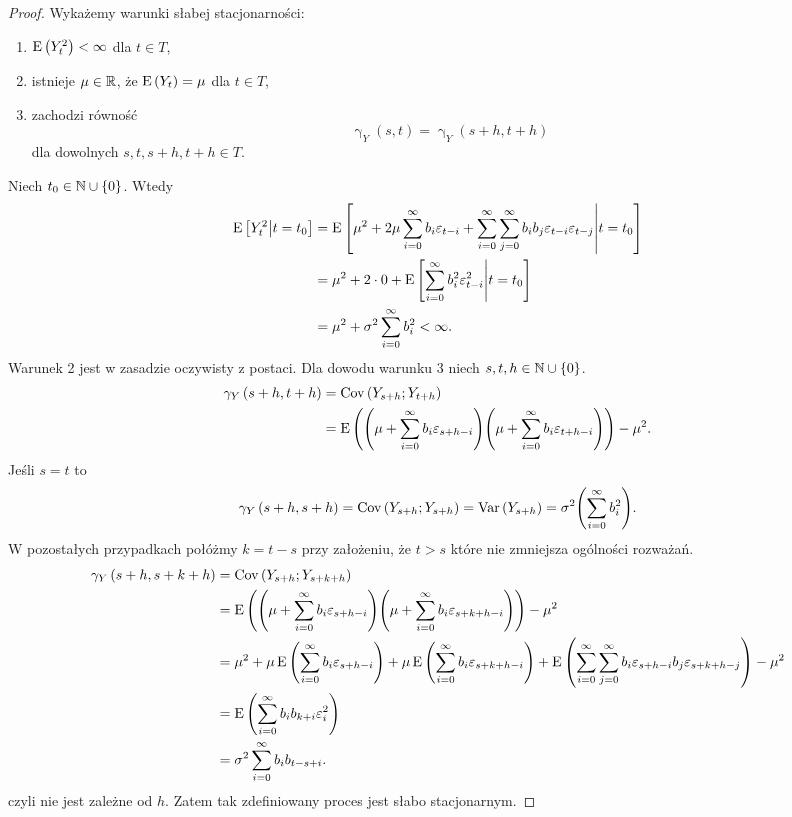 \documentclass[10pt,a4paper]{book}
\newcommand{\tsAutoCovariance}[3][\gamma]{\operatorname{#1}_{#2} \left({#3}\right)}
\begin{document}
\begin{proof}
Wykażemy warunki słabej stacjonarności:
\begin{enumerate}
\item $ \operatorname{E} \left({Y_t^2} \right) < \infty$ dla $t \in T$,
\item istnieje $\mu \in \mathbb{R}$, że $ \operatorname{E} \left({Y_t} \right) = \mu $ dla $t \in T$,
\item zachodzi równość
$$
\tsAutoCovariance{Y}{s,t} = \tsAutoCovariance{Y}{s+h,t+h} 
$$
dla dowolnych $s,t,s+h,t+h \in T$.
\end{enumerate}
Niech $ t_0 \in \mathbb{N} \cup \left\lbrace {0} \right\rbrace$. Wtedy
\begin{align*}
\ExConditional{Y_t^2}{t=t_0} &= \ExConditional{\mu^2 + 2 \mu \sum_{i=0}^{\infty} b_i \epsilon_{t-i} + \sum_{i=0}^{\infty} \sum_{j=0}^{\infty} b_i b_j \epsilon_{t-i} \epsilon_{t-j} }{t=t_0}  \\
& = \mu^2 + 2 \cdot 0 + \ExConditional{\sum_{i=0}^{\infty} b_i^2 \epsilon_{t-i}^2 }{t=t_0} \\
& = \mu^2 + \sigma^2 \sum_{i=0}^{\infty} b_i^2 < \infty.
\end{align*}
Warunek 2 jest w zasadzie oczywisty z postaci. Dla dowodu warunku 3 niech $s,t,h \in \mathbb{N} \cup \left\lbrace {0} \right\rbrace$.
\begin{align*}
\function{{\gamma_Y}}{s+h,t+h} &= \Covariance{Y_{s+h}}{Y_{t+h}} \\
&= \Ex{ \bracket{\mu + \sum_{i=0}^{\infty} b_i \epsilon_{s+h-i}} \bracket{\mu + \sum_{i=0}^{\infty} b_i \epsilon_{t+h-i}}} - \mu^2.
\end{align*}
Jeśli $s=t$ to 
$$
\function{\gamma_Y}{s+h,s+h} = \Covariance{Y_{s+h}}{Y_{s+h}} = \Variance{Y_{s+h}} = \sigma^2 \bracket{ \sum_{i=0}^{\infty} b_i^2}.
$$
W pozostałych przypadkach połóżmy $k=t-s$ przy założeniu, że $t > s$ które nie zmniejsza ogólności rozważań.
\begin{align*}
\function{{\gamma_Y}}{s+h,s+k+h} &= \Covariance{Y_{s+h}}{Y_{s+k+h}} \\
&= \Ex{ \bracket{\mu + \sum_{i=0}^{\infty} b_i \epsilon_{s+h-i}} \bracket{\mu + \sum_{i=0}^{\infty} b_i \epsilon_{s+k+h-i}}} - \mu^2 \\
& = \mu^2 + \mu \Ex{\sum_{i=0}^{\infty} b_i \epsilon_{s+h-i}} + \mu \Ex{\sum_{i=0}^{\infty} b_i \epsilon_{s+k+h-i}} + \Ex{\sum_{i=0}^{\infty} \sum_{j=0}^{\infty}  b_i \epsilon_{s+h-i} b_j \epsilon_{s+k+h-j}} - \mu^2 \\
&= \Ex{\sum_{i=0}^{\infty} b_i b_{k+i} \epsilon_i^2} \\
& =\sigma^2 \sum_{i=0}^{\infty} b_{i} b_{t-s+i}.
\end{align*}
czyli nie jest zależne od $h$. Zatem tak zdefiniowany proces jest słabo stacjonarnym.
\end{proof}
\end{document}
